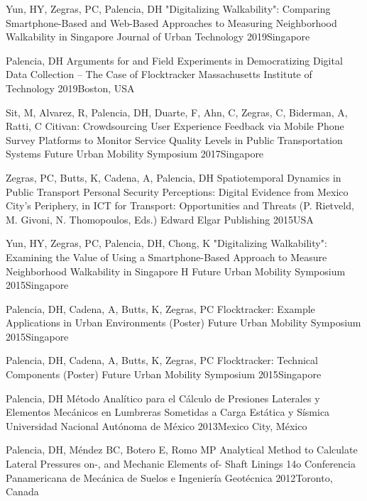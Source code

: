 
{Yun, HY, Zegras, PC, Palencia, DH}
{"Digitalizing Walkability": Comparing Smartphone-Based and Web-Based
Approaches to Measuring Neighborhood Walkability in Singapore}
{Journal of Urban Technology}
{2019}{Singapore}

{Palencia, DH}
{Arguments for and Field Experiments in Democratizing Digital Data
Collection -- The Case of Flocktracker}
{Massachusetts Institute of Technology}
{2019}{Boston, USA}

{Sit, M, Alvarez, R, Palencia, DH, Duarte, F, Ahn, C, Zegras, C,
Biderman, A, Ratti, C}
{Citivan: Crowdsourcing User Experience Feedback via Mobile Phone
  Survey Platforms to Monitor Service Quality Levels in Public
Transportation Systems}
{Future Urban Mobility Symposium}
{2017}{Singapore}

{Zegras, PC, Butts, K, Cadena, A, Palencia, DH}
{Spatiotemporal Dynamics in Public Transport Personal Security
  Perceptions: Digital Evidence from Mexico City's Periphery, in ICT
  for Transport: Opportunities and Threats (P. Rietveld, M. Givoni, N.
Thomopoulos, Eds.)}
{Edward Elgar Publishing}
{2015}{USA}

{Yun, HY, Zegras, PC, Palencia, DH, Chong, K}
{"Digitalizing Walkability": Examining the Value of Using a
Smartphone-Based Approach to Measure Neighborhood Walkability in Singapore}
{H Future Urban Mobility Symposium}
{2015}{Singapore}

{Palencia, DH, Cadena, A, Butts, K, Zegras, PC}
{Flocktracker: Example Applications in Urban Environments (Poster)}
{Future Urban Mobility Symposium}
{2015}{Singapore}

{Palencia, DH, Cadena, A, Butts, K, Zegras, PC}
{Flocktracker: Technical Components (Poster)}
{Future Urban Mobility Symposium}
{2015}{Singapore}

{Palencia, DH}
{Método Analítico para el Cálculo de Presiones Laterales y
Elementos Mecánicos en Lumbreras Sometidas a Carga Estática y Sísmica}
{Universidad Nacional Autónoma de México}
{2013}{Mexico City, México}

{Palencia, DH, Méndez BC, Botero E, Romo MP}
{Analytical Method to Calculate Lateral Pressures on-, and Mechanic
Elements of- Shaft Linings}
{14o Conferencia Panamericana de Mecánica de Suelos e Ingeniería
Geotécnica}
{2012}{Toronto, Canada}

